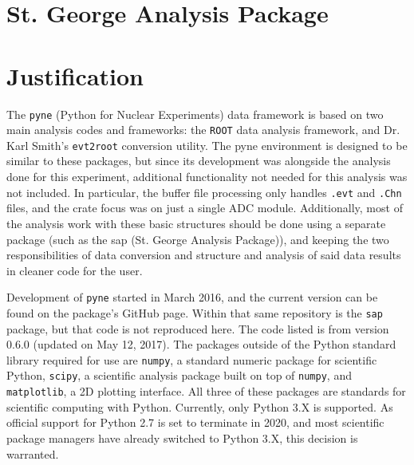 \section{St. George Analysis Package}


\section{Justification}

The \texttt{pyne} (Python for Nuclear Experiments) data framework is
based on two main analysis codes and frameworks: the \texttt{ROOT} data
analysis framework, and Dr. Karl Smith's \texttt{evt2root} conversion
utility. The pyne environment is designed to be similar to these
packages, but since its development was alongside the analysis done for
this experiment, additional functionality not needed for this analysis
was not included. In particular, the buffer file processing only handles
\texttt{.evt} and \texttt{.Chn} files, and the crate focus was on just a
single ADC module. Additionally, most of the analysis work with these
basic structures should be done using a separate package (such as the
sap (St. George Analysis Package)), and keeping the two responsibilities
of data conversion and structure and analysis of said data results in
cleaner code for the user.

Development of \texttt{pyne} started in March 2016, and the current
version can be found on the package's GitHub page. Within that same
repository is the \texttt{sap} package, but that code is not reproduced
here. The code listed is from version 0.6.0 (updated on May 12, 2017).
The packages outside of the Python standard library required for use are
\texttt{numpy}, a standard numeric package for scientific Python,
\texttt{scipy}, a scientific analysis package built on top of
\texttt{numpy}, and \texttt{matplotlib}, a 2D plotting interface. All
three of these packages are standards for scientific computing with
Python. Currently, only Python 3.X is supported. As official support for
Python 2.7 is set to terminate in 2020, and most scientific package
managers have already switched to Python 3.X, this decision is
warranted.

